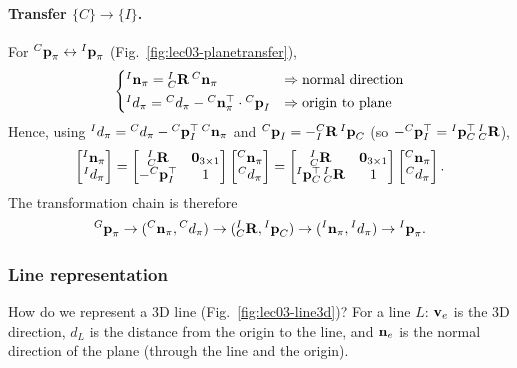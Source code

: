 \paragraph{Transfer $\{C\}\to\{I\}$.} For ${}^{C}\boldsymbol{\mathbf{p}}_\pi \leftrightarrow {}^{I}\boldsymbol{\mathbf{p}}_\pi$ (Fig.~\ref{fig:lec03-planetransfer}),
\begin{align}
\begin{cases}
{}^{I}\boldsymbol{\mathbf{n}}_\pi = {}^{I}_{C}\boldsymbol{\mathbf{R}}\,{}^{C}\boldsymbol{\mathbf{n}}_\pi & \Rightarrow \text{normal direction} \\[2pt]
{}^{I}d_\pi = {}^{C}d_\pi - {}^{C}\boldsymbol{\mathbf{n}}_\pi^\top\cdot{}^{C}\boldsymbol{\mathbf{p}}_I & \Rightarrow \text{origin to plane}
\end{cases}
\end{align}
Hence, using ${}^{I}d_\pi = {}^{C}d_\pi - {}^{C}\boldsymbol{\mathbf{p}}_I^\top\,{}^{C}\boldsymbol{\mathbf{n}}_\pi$ and ${}^{C}\boldsymbol{\mathbf{p}}_I = -{}^{C}_{I}\boldsymbol{\mathbf{R}}\,{}^{I}\boldsymbol{\mathbf{p}}_C$ (so $-{}^{C}\boldsymbol{\mathbf{p}}_I^\top = {}^{I}\boldsymbol{\mathbf{p}}_C^\top\,{}^{I}_{C}\boldsymbol{\mathbf{R}}$),
\begin{align}
\begin{bmatrix} {}^{I}\boldsymbol{\mathbf{n}}_\pi \\ {}^{I}d_\pi \end{bmatrix} = \begin{bmatrix} {}^{I}_{C}\boldsymbol{\mathbf{R}} & \boldsymbol{\mathbf{0}}_{3\times1} \\ -{}^{C}\boldsymbol{\mathbf{p}}_I^\top & 1 \end{bmatrix}\begin{bmatrix} {}^{C}\boldsymbol{\mathbf{n}}_\pi \\ {}^{C}d_\pi \end{bmatrix}
= \begin{bmatrix} {}^{I}_{C}\boldsymbol{\mathbf{R}} & \boldsymbol{\mathbf{0}}_{3\times1} \\ {}^{I}\boldsymbol{\mathbf{p}}_C^\top\,{}^{I}_{C}\boldsymbol{\mathbf{R}} & 1 \end{bmatrix}\begin{bmatrix} {}^{C}\boldsymbol{\mathbf{n}}_\pi \\ {}^{C}d_\pi \end{bmatrix}.
\end{align}
The transformation chain is therefore
\begin{align}
{}^{G}\boldsymbol{\mathbf{p}}_\pi \to ({}^{C}\boldsymbol{\mathbf{n}}_\pi,{}^{C}d_\pi) \to ({}^{I}_{C}\boldsymbol{\mathbf{R}},{}^{I}\boldsymbol{\mathbf{p}}_C) \to ({}^{I}\boldsymbol{\mathbf{n}}_\pi,{}^{I}d_\pi) \to {}^{I}\boldsymbol{\mathbf{p}}_\pi.
\end{align}

\subsubsection*{Line representation}
How do we represent a 3D line (Fig.~\ref{fig:lec03-line3d})? For a line $L$: $\boldsymbol{\mathbf{v}}_e$ is the 3D direction, $d_L$ is the distance from the origin to the line, and $\boldsymbol{\mathbf{n}}_e$ is the normal direction of the plane (through the line and the origin).

